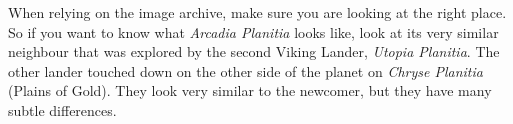 When relying on the image archive, make sure you are looking at the right place. So if you want to know what {\it Arcadia Planitia} looks like, look at its very similar neighbour that was explored by the second Viking Lander, {\it Utopia Planitia}. The other lander touched down on the other side of the planet on {\it Chryse Planitia} (Plains of Gold). They look very similar to the newcomer, but they have many subtle differences.

\StopChapter

